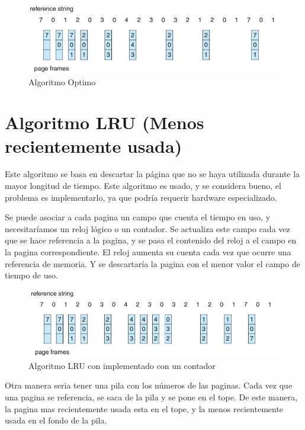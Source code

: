 \documentclass{article}
\begin{document}
\begin{figure}[H]
	\centering
	\includegraphics[scale=0.7]{img/optimo.png}
	\caption{Algoritmo Optimo}
\end{figure}

{\centering \section*{Algoritmo LRU (Menos recientemente usada)}}
Este algoritmo se basa en descartar la página que no se haya utilizada durante la mayor longitud de tiempo. 
Este algoritmo es usado, y se considera bueno, el problema es implementarlo, ya que podría requerir hardware especializado.

Se puede asociar a cada pagina un campo que cuenta el tiempo en uso, y necesitaríamos un reloj lógico o un contador. Se actualiza este campo cada vez que se hace referencia a la pagina, y se pasa el contenido del reloj a el campo en la pagina correspondiente. El reloj aumenta su cuenta cada vez que ocurre una referencia de memoria. Y se descartaría la pagina con el menor valor el campo de tiempo de uso.

\begin{figure}[H]
	\centering
	\includegraphics[scale=0.7]{img/lru1.png}
	\caption{Algoritmo LRU con implementado con un contador}
\end{figure}

Otra manera seria tener una pila con los números de las paginas. Cada vez que una pagina se referencia, se saca de la pila y se pone en el tope. De este manera, la pagina mas recientemente usada esta en el tope, y la menos recientemente usada en el fondo de la pila.
\end{document}
